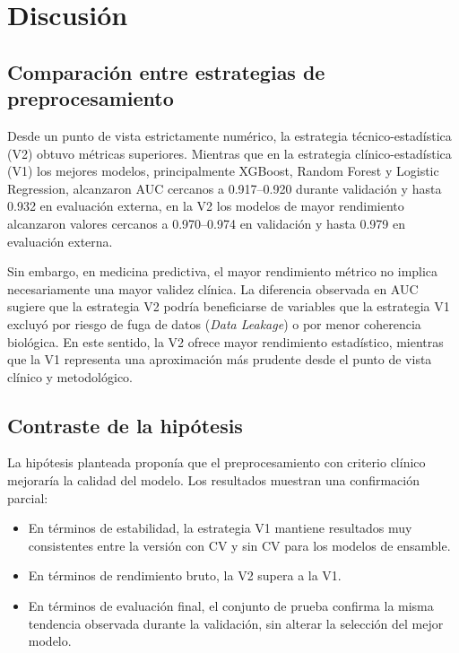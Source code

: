 \section{Discusión}\label{sec:discusion}

\subsection{Comparación entre estrategias de preprocesamiento}

Desde un punto de vista estrictamente numérico, la estrategia
técnico-estadística (V2) obtuvo métricas superiores. Mientras que en la
estrategia clínico-estadística (V1) los mejores modelos, principalmente
XGBoost, Random Forest y Logistic Regression, alcanzaron AUC cercanos a
0.917--0.920 durante validación y hasta 0.932 en evaluación externa, en la V2
los modelos de mayor rendimiento alcanzaron valores cercanos a 0.970--0.974 en
validación y hasta 0.979 en evaluación externa.

Sin embargo, en medicina predictiva, el mayor rendimiento métrico no implica
necesariamente una mayor validez clínica. La diferencia observada en AUC sugiere
que la estrategia V2 podría beneficiarse de variables que la estrategia V1
excluyó por riesgo de fuga de datos (\textit{Data Leakage}) o por menor coherencia biológica. En
este sentido, la V2 ofrece mayor rendimiento estadístico, mientras que la V1
representa una aproximación más prudente desde el punto de vista clínico y
metodológico.

\subsection{Contraste de la hipótesis}

La hipótesis planteada proponía que el preprocesamiento con criterio clínico
mejoraría la calidad del modelo. Los resultados muestran una confirmación
parcial:

\begin{itemize}
  \item En términos de estabilidad, la estrategia V1 mantiene resultados muy
    consistentes entre la versión con CV y sin CV para los modelos de ensamble.
  \item En términos de rendimiento bruto, la V2 supera a la V1.
  \item En términos de evaluación final, el conjunto de prueba confirma la misma
    tendencia observada durante la validación, sin alterar la selección del mejor
    modelo.
\end{itemize}

